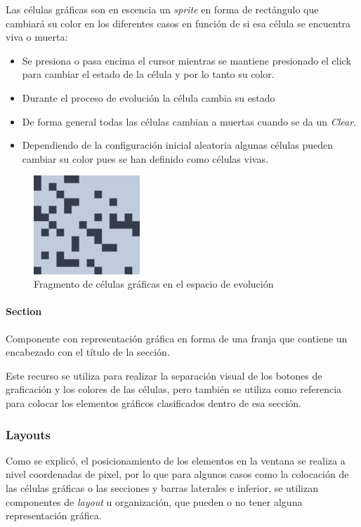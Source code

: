 \documentclass[]{article}
\begin{document}
				Las células gráficas son en escencia un \textit{sprite} en forma de rectángulo que cambiará su color en los diferentes casos en función de si esa célula se encuentra viva o muerta:
				\begin{itemize}
					\item Se presiona o pasa encima el cursor mientras se mantiene presionado el click para cambiar el estado de la célula y por lo tanto su color.
					\item Durante el proceso de evolución la célula cambia su estado
					\item De forma general todas las células cambian a muertas cuando se da un \textit{Clear}.
					\item Dependiendo de la configuración inicial aleatoria algunas células pueden cambiar su color pues se han definido como células vivas.
				\end{itemize}
				
				\begin{figure}[!h]
					\centering
					\includegraphics[width=4cm]{Imagenes/celulas_graficas.png}
					\caption{Fragmento de células gráficas en el espacio de evolución}
				\end{figure}
			
			
			\paragraph{Section}
				Componente con representación gráfica en forma de una franja que contiene un encabezado con el título de la sección.
				
				Este recurso se utiliza para realizar la separación visual de los botones de graficación y los colores de las células, pero también se utiliza como referencia para colocar los elementos gráficos clasificados dentro de esa sección.
				
		\subsubsection{Layouts}
			Como se explicó, el posicionamiento de los elementos en la ventana se realiza a nivel coordenadas de pixel, por lo que para algunos casos como la colocación de las células gráficas o las secciones y barras laterales e inferior, se utilizan componentes de \textit{layout} u organización, que pueden o no tener alguna representación gráfica.
			
\end{document}
